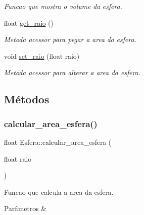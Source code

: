 \begin{DoxyCompactItemize}
\begin{DoxyCompactList}\small\item\em Funcao que mostra o volume da esfera. \end{DoxyCompactList}\item 
float \hyperlink{classEsfera_aaae2727eec6f18ecbe6cd7168f9b50a8}{get\+\_\+raio} ()
\begin{DoxyCompactList}\small\item\em Metoda acessor para pegar a area da esfera. \end{DoxyCompactList}\item 
void \hyperlink{classEsfera_ae4bb91e7baef60aacab71a73a4a4d06f}{set\+\_\+raio} (float raio)
\begin{DoxyCompactList}\small\item\em Metoda acessor para alterar a area da esfera. \end{DoxyCompactList}\end{DoxyCompactItemize}


\subsection{Métodos}
\mbox{\label{classEsfera_a3ad3c00d8c7dd3976356b7fce4c4963f}} 
\subsubsection{\texorpdfstring{calcular\+\_\+area\+\_\+esfera()}{calcular\_area\_esfera()}}
{\footnotesize\ttfamily float Esfera\+::calcular\+\_\+area\+\_\+esfera (\begin{DoxyParamCaption}\item[{float}]{raio }\end{DoxyParamCaption})}



Funcao que calcula a area da esfera. 


\begin{DoxyParams}{Parâmetros}
{\em } & \\
\hline
\end{DoxyParams}
\mbox{\label{classEsfera_afd9e4a6bf90e79bc73831c6fcbfc87b1}} 
